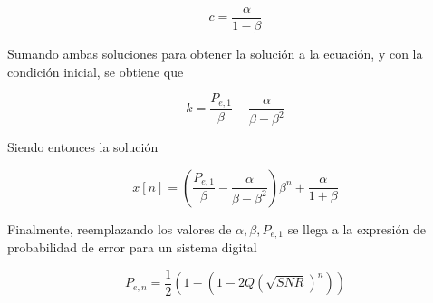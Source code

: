 \begin{equation}
c=\frac{\alpha}{1-\beta}
\end{equation} 

Sumando ambas soluciones para obtener la solución a la ecuación, y con la condición inicial, se obtiene que 

\begin{equation}
k = \frac{P_{e,1}}{\beta}-\frac{\alpha}{\beta-\beta^2}
\end{equation} 

Siendo entonces la solución

\begin{equation}
x[n]=(\frac{P_{e,1}}{\beta}-\frac{\alpha}{\beta-\beta^2})\beta^n+\frac{\alpha}{1+\beta}
\end{equation} 

Finalmente, reemplazando los valores de $\alpha,\beta,P_{e,1}$ se llega a la expresión de probabilidad de error para un sistema digital

\begin{equation}
P_{e,n}=\frac{1}{2}(1-(1-2Q(\sqrt{SNR})^n))
\end{equation} 